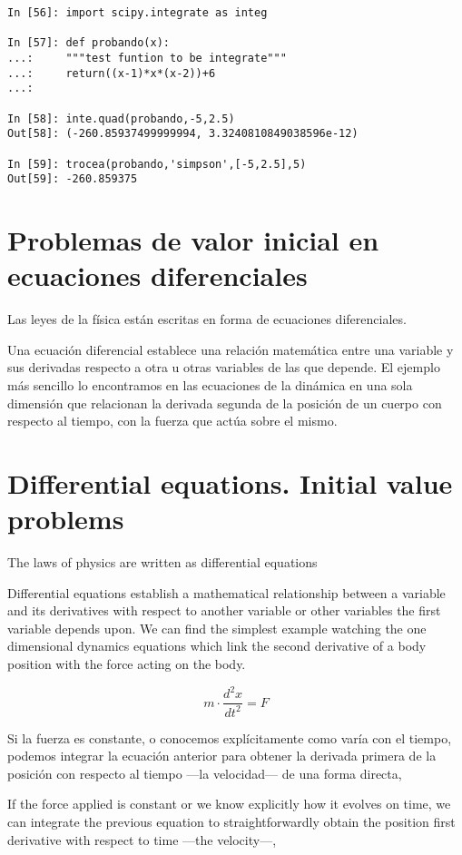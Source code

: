 \begin{verbatim}
In [56]: import scipy.integrate as integ

In [57]: def probando(x):
...:     """test funtion to be integrate"""
...:     return((x-1)*x*(x-2))+6
...:     

In [58]: inte.quad(probando,-5,2.5)
Out[58]: (-260.85937499999994, 3.3240810849038596e-12)

In [59]: trocea(probando,'simpson',[-5,2.5],5)
Out[59]: -260.859375
\end{verbatim}

\begin{paracol}{2}
\section{Problemas de valor inicial en ecuaciones diferenciales}
Las leyes de la física están escritas en forma de ecuaciones diferenciales.  

Una ecuación diferencial establece una relación matemática entre una variable y sus derivadas respecto a otra u otras variables de las que depende. El ejemplo más sencillo lo encontramos en las ecuaciones de la dinámica en una sola dimensión que relacionan la derivada segunda de la posición de un cuerpo con respecto al tiempo, con la fuerza que actúa sobre el mismo.
\switchcolumn
\section{Differential equations. Initial value problems}
The laws of physics are written as differential equations 

Differential equations establish a mathematical relationship between a variable and its derivatives with respect to another variable or other variables the first variable depends upon. We can find the simplest example watching the one dimensional dynamics equations which link the second derivative of a body position with the force acting on the body.  
\end{paracol}
\begin{equation*}
m\cdot \frac{d^2x}{dt^2}=F
\end{equation*}
\begin{paracol}{2}
Si la fuerza es constante, o conocemos explícitamente como varía con el tiempo, podemos integrar la ecuación anterior para obtener la derivada primera de la posición con respecto al tiempo ---la velocidad--- de una forma directa,

\switchcolumn
If the force applied is constant or we know explicitly how it evolves on time, we can integrate the previous equation to straightforwardly obtain the position first derivative with respect to time ---the velocity---,
\end{paracol}
